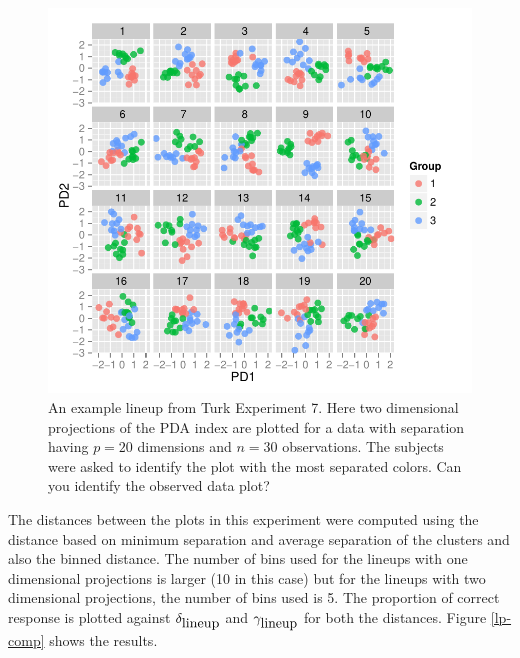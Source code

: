 \documentclass[12]{article}
\begin{document}
\begin{figure}[htbp]
\centering
\includegraphics[width=.95\textwidth]{largep-example.pdf}
\caption{An example lineup from Turk Experiment 7. Here two dimensional projections of the PDA index are plotted for a data with separation having $p = 20$ dimensions and $n = 30$ observations. The subjects were asked to identify the plot with the most separated colors. Can you identify the observed data plot?}
\label{largep}
\end{figure}

The distances between the plots in this experiment were computed using the distance based on minimum separation and average separation of the clusters and also the binned distance. The number of bins used for the lineups with one dimensional projections is larger (10 in this case) but for the lineups with two dimensional projections, the number of bins used is 5. The proportion of correct response is plotted against $\delta_{\hbox{lineup}}$ and $\gamma_{\hbox{lineup}}$ for both the distances. Figure \ref{lp-comp} shows the results.
\end{document}
